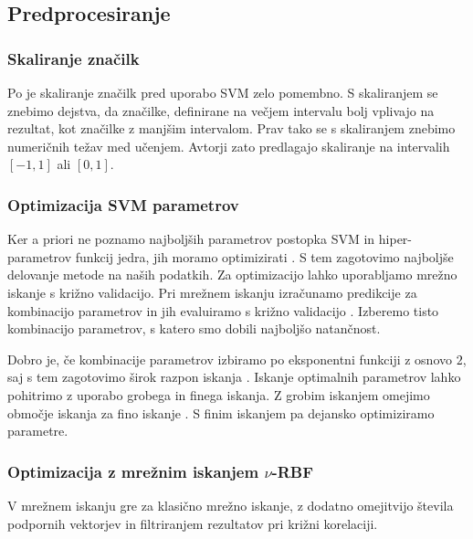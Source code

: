 {\subsection{Predprocesiranje}
\subsubsection{Skaliranje značilk}

Po \cite{hsu2003practical} je skaliranje značilk pred uporabo SVM zelo pomembno. S skaliranjem se znebimo dejstva, da značilke, definirane na večjem intervalu bolj vplivajo na rezultat, kot značilke z manjšim intervalom. Prav tako se s skaliranjem znebimo numeričnih težav med učenjem. Avtorji \cite{hsu2003practical} zato predlagajo skaliranje na intervalih $[-1, 1]$ ali $[0, 1]$.







\subsubsection{Optimizacija SVM parametrov}\label{sec:optimizacija-svm-parametrov}

Ker a priori ne poznamo najboljših parametrov postopka SVM in hiper-parametrov funkcij jedra, jih moramo optimizirati \cite{hsu2003practical}. S tem zagotovimo najboljše delovanje metode na naših podatkih. Za optimizacijo lahko uporabljamo mrežno iskanje s križno validacijo.  Pri mrežnem iskanju izračunamo predikcije za kombinacijo parametrov in jih evaluiramo s križno validacijo \cite{hsu2003practical}. Izberemo tisto kombinacijo parametrov, s katero smo dobili najboljšo natančnost. 

Dobro je, če kombinacije parametrov izbiramo po eksponentni funkciji z osnovo $2$, saj s tem zagotovimo širok razpon iskanja \cite{hsu2003practical}. Iskanje optimalnih parametrov lahko pohitrimo z uporabo grobega in finega iskanja. Z grobim iskanjem omejimo območje iskanja za fino iskanje \cite{hsu2003practical}. S finim iskanjem pa dejansko optimiziramo parametre.


\subsubsection{Optimizacija z mrežnim iskanjem \texorpdfstring{$\nu$}{nu}-RBF}\label{sec:nurbf}
V mrežnem iskanju \nurbf gre za klasično mrežno iskanje, z dodatno omejitvijo števila podpornih vektorjev in filtriranjem rezultatov pri križni korelaciji.

}
